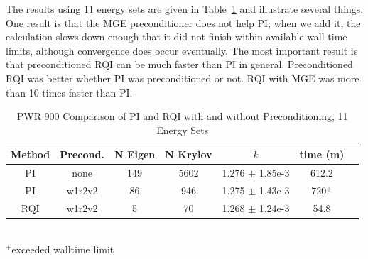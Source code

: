 \documentclass{article}                                                                           %
\begin{document}
The results using 11 energy sets are given in Table~\ref{tab:PWR all} and illustrate several things. One result is that the MGE preconditioner does not
help PI; when we add it, the calculation slows down enough that it did not
finish within available wall time limits, although convergence does occur
eventually.  The most important result is that preconditioned RQI can be much
faster than PI in general.  Preconditioned RQI was better whether PI was
preconditioned or not. RQI with MGE was more than 10 times faster than PI.
%
\begin{table}[!h]
\caption{PWR 900 Comparison of PI and RQI with and without Preconditioning, 11 Energy Sets}
\label{tab:PWR all}
  \begin{center}
    \begin{tabular}{| c | c | c | c | c | c | c |}
      \hline
      Method & Precond. & N Eigen & N Krylov & $k$ & time (m) \\\hline
      PI   & none     & 149 & 5602 & 1.276 $\pm$ 1.85e-3 & 612.2 \\
      PI   & w1r2v2 & 86   & 946   & 1.275 $\pm$ 1.43e-3 & 720$^+$ \\
      RQI & w1r2v2 & 5     & 70     & 1.268 $\pm$ 1.24e-3 & 54.8 \\
      \hline
    \end{tabular}\\
    $^{+}$exceeded walltime limit\\
  \end{center}
\end{table}
\end{document}
